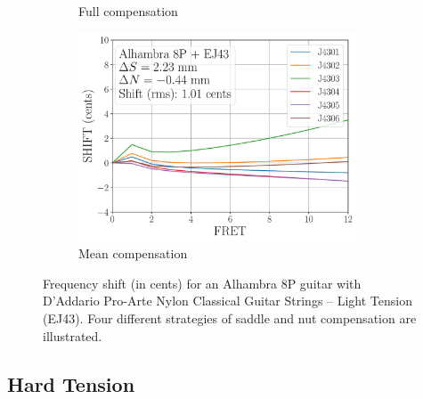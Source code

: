 \begin{figure}
\begin{subfigure}[b]{0.45\textwidth}
   \caption{Full compensation}
   \label{fig:shift_alhambra8p_ej43_full}
  \end{subfigure}
  \hspace{0.25in}
  \begin{subfigure}[b]{0.45\textwidth}
   \centering
   \includegraphics[width=3.25in]{../figures/shift_alhambra8p_ej43_mean}
   \caption{Mean compensation}
   \label{fig:shift_alhambra8p_ej43_mean}
  \end{subfigure}
  \caption{\label{fig:compensation_alhambra8p_ej43} Frequency shift (in cents) for an Alhambra 8P guitar with D'Addario Pro-Arte Nylon Classical Guitar Strings -- Light Tension (EJ43). Four different strategies of saddle and nut compensation are illustrated.}
 \end{figure}

 \newpage
 \subsection{Hard Tension}



